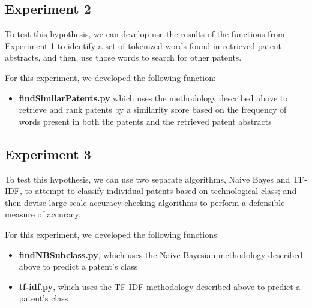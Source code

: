 \documentclass{article}
\begin{document}
\subsection{Experiment 2}
\noindent{}

To test this hypothesis, we can develop use the results of the functions from Experiment 1 to identify a set of tokenized words found in retrieved patent abstracts, and then, use those words to search for other patents.

For this experiment, we developed the following function:
\begin{itemize}
  \item \textbf{findSimilarPatents.py} which uses the methodology described above to retrieve and rank patents by a similarity score based on the frequency of words present in both the patents and the retrieved patent abstracts
\end{itemize}

\subsection{Experiment 3}
\noindent{}

To test this hypothesis, we can use two separate algorithms, Naive Bayes and TF-IDF, to attempt to classify individual patents based on technological class; and then devise large-scale accuracy-checking algorithms to perform a defensible measure of accuracy.

For this experiment, we developed the following functions:
\begin{itemize}
  \item \textbf{findNBSubclass.py}, which uses the Naive Bayesian methodology described above to predict a patent’s class
  \item \textbf{tf-idf.py}, which uses the TF-IDF methodology described above to predict a patent’s class
\end{itemize}
\end{document}
